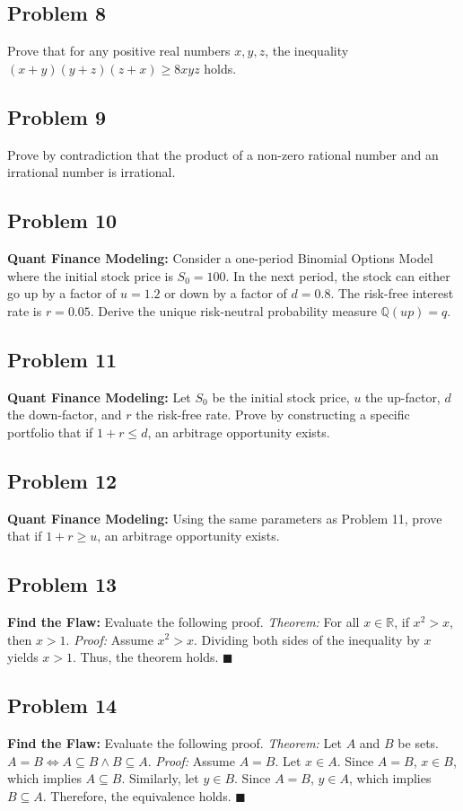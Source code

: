 \documentclass[11pt]{article}
\begin{document}
\subsection{Problem 8}
Prove that for any positive real numbers $x, y, z$, the inequality $(x+y)(y+z)(z+x) \ge 8xyz$ holds.

\subsection{Problem 9}
Prove by contradiction that the product of a non-zero rational number and an irrational number is irrational.

\subsection{Problem 10}
\textbf{Quant Finance Modeling:} Consider a one-period Binomial Options Model where the initial stock price is $S_0 = 100$. In the next period, the stock can either go up by a factor of $u = 1.2$ or down by a factor of $d = 0.8$. The risk-free interest rate is $r = 0.05$. Derive the unique risk-neutral probability measure $\mathbb{Q}(up) = q$.

\subsection{Problem 11}
\textbf{Quant Finance Modeling:} Let $S_0$ be the initial stock price, $u$ the up-factor, $d$ the down-factor, and $r$ the risk-free rate. Prove by constructing a specific portfolio that if $1+r \le d$, an arbitrage opportunity exists.

\subsection{Problem 12}
\textbf{Quant Finance Modeling:} Using the same parameters as Problem 11, prove that if $1+r \ge u$, an arbitrage opportunity exists.

\subsection{Problem 13}
\textbf{Find the Flaw:} Evaluate the following proof.
\textit{Theorem:} For all $x \in \mathbb{R}$, if $x^2 > x$, then $x > 1$.
\textit{Proof:} Assume $x^2 > x$. Dividing both sides of the inequality by $x$ yields $x > 1$. Thus, the theorem holds. $\blacksquare$

\subsection{Problem 14}
\textbf{Find the Flaw:} Evaluate the following proof.
\textit{Theorem:} Let $A$ and $B$ be sets. $A = B \iff A \subseteq B \land B \subseteq A$.
\textit{Proof:} Assume $A = B$. Let $x \in A$. Since $A = B$, $x \in B$, which implies $A \subseteq B$. Similarly, let $y \in B$. Since $A = B$, $y \in A$, which implies $B \subseteq A$. Therefore, the equivalence holds. $\blacksquare$
\end{document}
